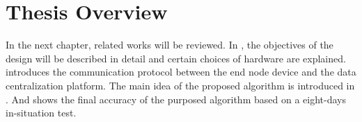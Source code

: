 \section{Thesis Overview}
In the next chapter, related works will be reviewed. In , the objectives of the design will be described in detail and certain choices of hardware are explained.  introduces the communication protocol between the end node device and the data centralization platform. The main idea of the proposed algorithm is introduced in . And  shows the final accuracy of the purposed algorithm based on a eight-days in-situation test.






